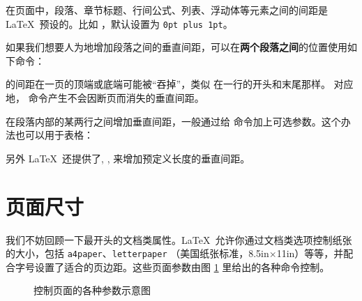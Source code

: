 在页面中，段落、章节标题、行间公式、列表、浮动体等元素之间的间距是 \LaTeX\ 预设的。比如  ，默认设置为 \texttt{0pt plus 1pt}。

如果我们想要人为地增加段落之间的垂直间距，可以在\textbf{两个段落之间}的位置使用如下命令：
\begin{command}
\end{command}

 的间距在一页的顶端或底端可能被“吞掉”，类似  在一行的开头和末尾那样。
对应地， 命令产生不会因断页而消失的垂直间距。

在段落内部的某两行之间增加垂直间距，一般通过给  命令加上可选参数。这个办法也可以用于表格：
\begin{command}
\end{command}

另外 \LaTeX\ 还提供了, ,  来增加预定义长度的垂直间距。

\section{页面尺寸}

我们不妨回顾一下最开头的文档类属性。\LaTeX\ 允许你通过文档类选项控制纸张的大小，包括 \texttt{a4paper}、\texttt{letterpaper}
（美国纸张标准，8.5in$\times$11in）等等，并配合字号设置了适合的页边距。这些页面参数由图 \ref{fig:layouts} 里给出的各种命令控制。

\begin{figure}[!p]
\currentpage
\oddpagelayouttrue
\pagediagram
\caption{控制页面的各种参数示意图} \label{fig:layouts}
\end{figure}

